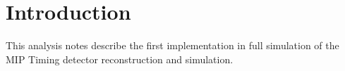 \section{Introduction}

This analysis notes describe the first implementation in full simulation of the MIP Timing detector reconstruction and simulation.
